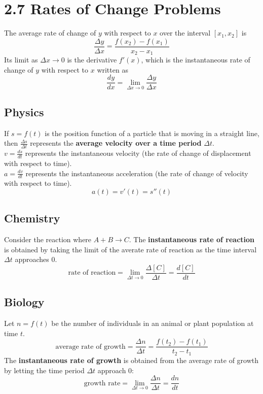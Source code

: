 %
%

\section*{2.7 Rates of Change Problems}

The average rate of change of \(y\) with respect to \(x\) over the interval \([x_1, x_2]\) is
$$ \frac{\Delta y}{\Delta x} = \frac{f(x_2)-f(x_1)}{x_2-x_1} $$
Its limit as \(\Delta x \to 0\) is the derivative \(f'(x)\), which is the instantaneous rate of change of \(y\) with respect to \(x\) written as
$$ \frac{dy}{dx} = \lim_{\Delta x \to 0}\frac{\Delta y}{\Delta x} $$

\subsection*{Physics}

If \(s = f(t)\) is the position function of a particle that is moving in a straight line, then \(\frac{\Delta s}{\Delta t}\) represents the \textbf{average velocity over a time period} \(\Delta t\).\\
\(v=\frac{ds}{dt}\) represents the instantaneous velocity (the rate of change of displacement with respect to time).\\
\(a=\frac{dv}{dt}\) represents the instantaneous acceleration (the rate of change of velocity with respect to time).
$$ a(t)=v'(t)=s''(t) $$

\subsection*{Chemistry}

Consider the reaction where \(A + B \to C\). The \textbf{instantaneous rate of reaction} is obtained by taking the limit of the averate rate of reaction as the time interval \(\Delta t\) approaches 0.
$$ \text{rate of reaction} = \lim_{\Delta t \to 0}\frac{\Delta [C]}{\Delta t} = \frac{d[C]}{dt} $$

\subsection*{Biology}

Let \(n=f(t)\) be the number of individuals in an animal or plant population at time \(t\).
$$ \text{average rate of growth} = \frac{\Delta n}{\Delta t} = \frac{f(t_2)-f(t_1)}{t_2-t_1} $$
The \textbf{instantaneous rate of growth} is obtained from the average rate of growth by letting the time period \(\Delta t\) approach 0:
$$ \text{growth rate} = \lim_{\Delta t \to 0}\frac{\Delta n}{\Delta t} = \frac{dn}{dt} $$
